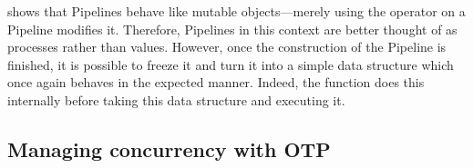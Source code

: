  shows that Pipelines behave like mutable objects---merely using the \exs{~>} operator on a Pipeline modifies it.
Therefore, Pipelines in this context are better thought of as processes rather than values.
However, once the construction of the Pipeline is finished, it is possible to freeze it and turn it into a simple data structure which once again behaves in the expected manner.
Indeed, the  function does this internally before taking this data structure and executing it.

\subsection{Managing concurrency with OTP}\label{sec:impl:approach:concurrency}


